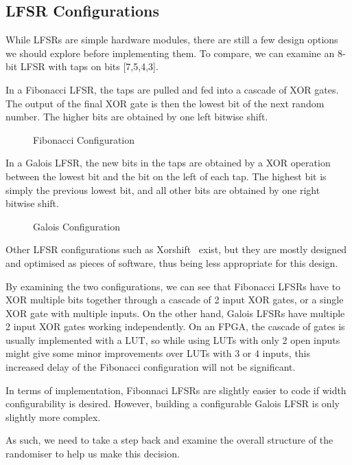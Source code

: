 \subsection{LFSR Configurations}

While LFSRs are simple hardware modules, there are still a few design options we should explore before implementing them.
To compare, we can examine an 8-bit LFSR with taps on bits [7,5,4,3].

In a Fibonacci LFSR, the taps are pulled and fed into a cascade of XOR gates.
The output of the final XOR gate is then the lowest bit of the next random number.
The higher bits are obtained by one left bitwise shift.

\begin{figure}[H]
  \centering
  
  \caption{Fibonacci Configuration}
  \label{FibLFSR}
\end{figure}

In a Galois LFSR, the new bits in the taps are obtained by a XOR operation between the lowest bit and the bit on the left of each tap.
The highest bit is simply the previous lowest bit, and all other bits are obtained by one right bitwise shift.

\begin{figure}[H]
  \centering
  
  \caption{Galois Configuration}
  \label{GalLFSR}
\end{figure}

Other LFSR configurations such as Xorshift~\cite{Marsaglia1} exist, but they are mostly designed and optimised as pieces of software, thus being less appropriate for this design.

By examining the two configurations, we can see that Fibonacci LFSRs have to XOR multiple bits together through a cascade of 2 input XOR gates, or a single XOR gate with multiple inputs.
On the other hand, Galois LFSRs have multiple 2 input XOR gates working independently.
On an FPGA, the cascade of gates is usually implemented with a LUT, so while using LUTs with only 2 open inputs might give some minor improvements over LUTs with 3 or 4 inputs, this increased delay of the Fibonacci configuration will not be significant.

In terms of implementation, Fibonnaci LFSRs are slightly easier to code if width configurability is desired.
However, building a configurable Galois LFSR is only slightly more complex.

As such, we need to take a step back and examine the overall structure of the randomiser to help us make this decision.

